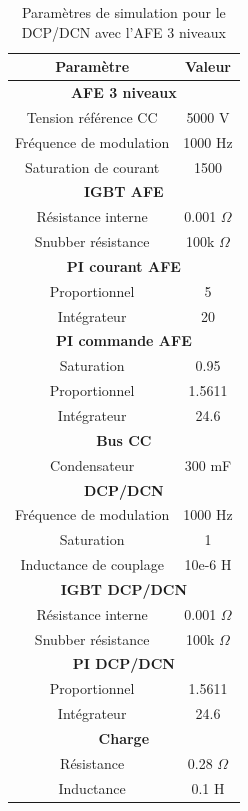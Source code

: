 \documentclass[11pt,letterpaper,final]{report}
\begin{document}
\begin{table}[htb]
\centering
\begin{tabular}{|c|c|} 
  \hline
  \textbf{Paramètre} & \textbf{Valeur}  \\
  \hline\hline \hline
  \multicolumn{2}{|c|}{\textbf{AFE 3 niveaux}}\\ \hline \hline 
  Tension référence CC & 5000 V\\ \hline
  Fréquence de modulation & 1000 Hz \\ \hline
  Saturation de courant& 1500 \\ \hline \hline
  \multicolumn{2}{|c|}{\textbf{IGBT AFE}}\\ \hline
  Résistance interne & 0.001 $\Omega$\\
  Snubber résistance & 100k $\Omega$\\ \hline \hline
   \multicolumn{2}{|c|}{\textbf{PI courant AFE}}\\ \hline
  Proportionnel & 5 \\
  Intégrateur & 20 \\ \hline \hline
  \multicolumn{2}{|c|}{\textbf{PI commande AFE}}\\ \hline
  Saturation & 0.95\\
  Proportionnel & 1.5611 \\
  Intégrateur & 24.6 \\ \hline \hline
  \multicolumn{2}{|c|}{\textbf{Bus CC}}\\ \hline
  Condensateur & 300 mF\\
  \hline \hline \hline
  
  \multicolumn{2}{|c|}{\textbf{DCP/DCN}}\\ \hline \hline
  Fréquence de modulation & 1000 Hz\\ \hline
  Saturation & 1 \\ \hline
  Inductance de couplage & 10e-6 H \\ \hline \hline
  \multicolumn{2}{|c|}{\textbf{IGBT DCP/DCN}}\\ \hline
  Résistance interne & 0.001 $\Omega$\\
  Snubber résistance & 100k $\Omega$\\ \hline \hline
   \multicolumn{2}{|c|}{\textbf{PI DCP/DCN}}\\ \hline
  Proportionnel & 1.5611 \\
  Intégrateur & 24.6 \\ \hline \hline
  \multicolumn{2}{|c|}{\textbf{Charge}}\\ \hline
  Résistance & 0.28 $\Omega$\\
  Inductance & 0.1 H \\
  \hline
\end{tabular}
\caption{Paramètres de simulation pour le DCP/DCN avec l'AFE 3 niveaux}
\label{p_AF_DCP}
\end{table}
\end{document}
